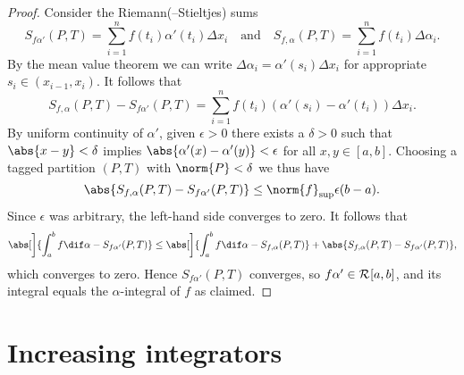 \documentclass[article, a4paper, 11pt, oneside]{memoir}
\numberwithin{equation}{chapter}
\begin{document}
\begin{proof}
    Consider the Riemann(--Stieltjes) sums
    \begin{equation*}
        S_{f\alpha'}(P,T)
            = \sum_{i=1}^n f(t_i) \alpha'(t_i) \Delta x_i
        \quad \text{and} \quad
        S_{f,\alpha}(P,T)
            = \sum_{i=1}^n f(t_i) \Delta \alpha_i.
    \end{equation*}
    By the mean value theorem we can write $\Delta \alpha_i = \alpha'(s_i) \Delta x_i$ for appropriate $s_i \in (x_{i-1}, x_i)$. It follows that
    \begin{equation*}
        S_{f,\alpha}(P,T) - S_{f\alpha'}(P,T)
            = \sum_{i=1}^n f(t_i) (\alpha'(s_i) - \alpha'(t_i)) \Delta x_i.
    \end{equation*}
    By uniform continuity of $\alpha'$, given $\epsilon > 0$ there exists a $\delta > 0$ such that $\abs{x-y} < \delta$ implies $\abs{\alpha'(x) - \alpha'(y)} < \epsilon$ for all $x,y \in [a,b]$. Choosing a tagged partition $(P,T)$ with $\norm{P} < \delta$ we thus have
    \begin{equation*}
        \abs{S_{f,\alpha}(P,T) - S_{f\alpha'}(P,T)}
            \leq \norm{f}_{\sup} \epsilon (b-a).
    \end{equation*}
    Since $\epsilon$ was arbitrary, the left-hand side converges to zero. It follows that
    \begin{equation*}
        \abs[\bigg]{ \int_a^b f \dif\alpha - S_{f\alpha'}(P,T) }
            \leq \abs[\bigg]{ \int_a^b f \dif\alpha - S_{f,\alpha}(P,T) } + \abs{ S_{f,\alpha}(P,T) - S_{f\alpha'}(P,T) },
    \end{equation*}
    which converges to zero. Hence $S_{f\alpha'}(P,T)$ converges, so $f\alpha' \in \mathcal{R}_{}[a,b]$, and its integral equals the $\alpha$-integral of $f$ as claimed.
\end{proof}


\section{Increasing integrators}
\end{document}
